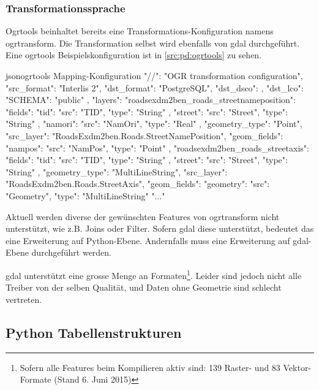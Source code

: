 \subsubsection{Transformationssprache}
Ogrtools beinhaltet bereits eine Transformations-Konfiguration namens ogrtransform. Die Transformation selbst wird ebenfalls von \gls{gdal} durchgeführt.
Eine ogrtools Beispielskonfiguration \cite[README, ogrtransform library]{ogrtools} ist in \cref{src:pd:ogrtools} zu sehen.

\begin{srclst}[label=src:pd:ogrtools]{json}{ogrtools Mapping-Konfiguration}
{
  "//": "OGR transformation configuration",
  "src_format": "Interlis 2",
  "dst_format": "PostgreSQL",
  "dst_dsco": {},
  "dst_lco": {
    "SCHEMA": "public"
  },
  "layers": {
    "roadsexdm2ben_roads_streetnameposition": {
      "fields": {
        "tid": {
          "src": "TID",
          "type": "String"
        },
        "street": {
          "src": "Street",
          "type": "String"
        },
        "namori": {
          "src": "NamOri",
          "type": "Real"
        }
      },
      "geometry_type": "Point",
      "src_layer": "RoadsExdm2ben.Roads.StreetNamePosition",
      "geom_fields": {
        "nampos": {
          "src": "NamPos",
          "type": "Point"
        }
      }
    },
    "roadsexdm2ben_roads_streetaxis": {
      "fields": {
        "tid": {
          "src": "TID",
          "type": "String"
        },
        "street": {
          "src": "Street",
          "type": "String"
        }
      },
      "geometry_type": "MultiLineString",
      "src_layer": "RoadsExdm2ben.Roads.StreetAxis",
      "geom_fields": {
        "geometry": {
          "src": "Geometry",
          "type": "MultiLineString"
        }
      }
    }
  }
  "..."
}
\end{srclst}

Aktuell werden diverse der gewünschten Features von ogrtransform nicht unterstützt, wie z.B. Joins oder Filter. Sofern \gls{gdal} diese unterstützt, bedeutet das eine Erweiterung auf Python-Ebene. Andernfalls muss eine Erweiterung auf \gls{gdal}-Ebene durchgeführt werden.

\gls{gdal} unterstützt eine grosse Menge an Formaten\footnote{Sofern alle Features beim Kompilieren aktiv sind: 139 Raster- und 83 Vektor-Formate (Stand 6. Juni 2015)}. Leider sind jedoch nicht alle Treiber von der selben Qualität, und Daten ohne Geometrie sind schlecht vertreten.

\subsection{Python Tabellenstrukturen}

